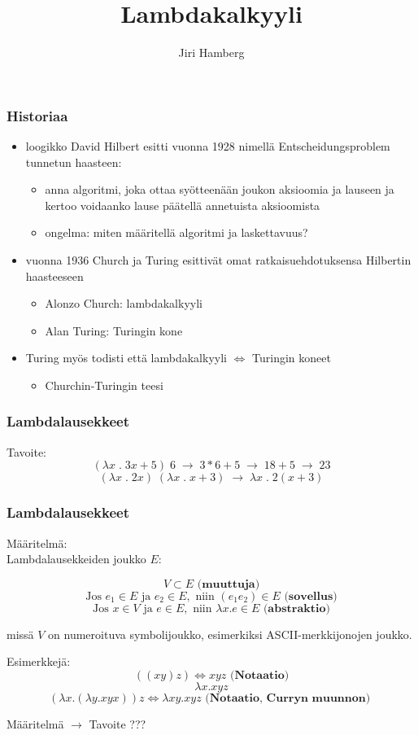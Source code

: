 \documentclass[12pt]{beamer}
\begin{document}
\title{Lambdakalkyyli}
\author{Jiri Hamberg}
\frame{\maketitle}

\begin{frame}
\frametitle{Historiaa}

\begin{itemize}
\item loogikko David Hilbert esitti vuonna 1928 nimellä Entscheidungsproblem tunnetun haasteen:
	\begin{itemize}
	\item anna algoritmi, joka ottaa syötteenään joukon aksioomia ja lauseen ja kertoo voidaanko lause päätellä annetuista aksioomista
	\item \alert{ongelma: miten määritellä algoritmi ja laskettavuus?}
\pause	
	\end{itemize}
\item vuonna 1936 Church ja Turing esittivät omat ratkaisuehdotuksensa Hilbertin haasteeseen
	\begin{itemize}
	\item Alonzo Church: lambdakalkyyli	
	\item Alan Turing: Turingin kone
	\end{itemize}
\pause
\item Turing myös todisti että lambdakalkyyli $\Leftrightarrow$ Turingin koneet  
	\begin{itemize} \item \alert{Churchin-Turingin teesi} \end{itemize} 
\end{itemize}
\end{frame}

\begin{frame}
\frametitle{Lambdalausekkeet}
Tavoite:
\[ 
(\lambda x \;. \; 3x + 5) \; 6 \; \rightarrow \; 3 * 6 + 5 \; \rightarrow \; 18 + 5 \; \rightarrow \; 23 
\]
\pause
\[ 
(\lambda x \;. \; 2x) \; (\lambda x \;. \; x + 3) \; \rightarrow \; \lambda x \; . \; 2(x + 3) 
\]
\end{frame}

\begin{frame}
\frametitle{Lambdalausekkeet}
Määritelmä: \\
Lambdalausekkeiden joukko $E$:

\[ V \subset E \textbf{  (muuttuja)}\]
\[ \text{Jos } e_{1} \in E \text{ ja } e_{2} \in E, \text{ niin }  (e_{1}e_{2}) \in E \textbf{  (sovellus)} \]
\[ \text{Jos } x \in V \text{ ja } e \in E, \text{ niin } \lambda x.e \in E \textbf{  (abstraktio)}\]

missä $V$ on numeroituva symbolijoukko, esimerkiksi ASCII-merkkijonojen joukko.

\pause
\par
Esimerkkejä:
\[ ((xy)z)  \Leftrightarrow xyz \textbf{  (Notaatio)} \]
\[ \lambda x . xyz \]
\[ (\lambda x . (\lambda y . xyx)) z \Leftrightarrow \lambda xy . xyz \textbf{  (Notaatio, Curryn muunnon) } \]
\par
\pause
\alert{Määritelmä $\rightarrow$ Tavoite ???}
\end{frame}
\end{document}

